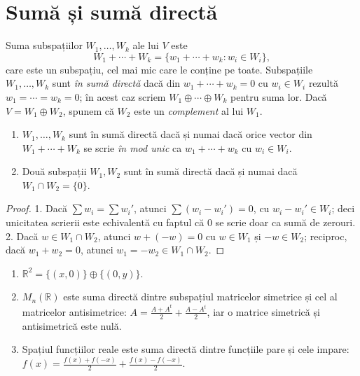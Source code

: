 \section{Sumă și sumă directă}

\begin{definitie}
Suma subspațiilor $W_1,\dots,W_k$ ale lui $V$ este
\[
W_1+\cdots+W_k=\{w_1+\cdots+w_k : w_i\in W_i\},
\]
care este un subspațiu, cel mai mic care le conține pe toate. Subspațiile $W_1,\dots,W_k$ sunt \emph{în sumă directă} dacă din $w_1+\cdots+w_k=0$ cu $w_i\in W_i$ rezultă $w_1=\cdots=w_k=0$; în acest caz scriem $W_1\oplus\cdots\oplus W_k$ pentru suma lor. Dacă $V=W_1\oplus W_2$, spunem că $W_2$ este un \emph{complement} al lui $W_1$.
\end{definitie}

\begin{propozitie}\label{prop:sumadirecta}
\begin{enumerate}
\item $W_1,\dots,W_k$ sunt în sumă directă dacă și numai dacă orice vector din $W_1+\cdots+W_k$ se scrie \emph{în mod unic} ca $w_1+\cdots+w_k$ cu $w_i\in W_i$.
\item Două subspații $W_1,W_2$ sunt în sumă directă dacă și numai dacă $W_1\cap W_2=\{0\}$.
\end{enumerate}
\end{propozitie}

\begin{proof}
1. Dacă $\sum w_i=\sum w_i'$, atunci $\sum(w_i-w_i')=0$, cu $w_i-w_i'\in W_i$; deci unicitatea scrierii este echivalentă cu faptul că $0$ se scrie doar ca sumă de zerouri.
2. Dacă $w\in W_1\cap W_2$, atunci $w+(-w)=0$ cu $w\in W_1$ și $-w\in W_2$; reciproc, dacă $w_1+w_2=0$, atunci $w_1=-w_2\in W_1\cap W_2$.
\end{proof}

\begin{exemplu}
\begin{enumerate}
\item $\mathbb{R}^2=\{(x,0)\}\oplus\{(0,y)\}$.
\item $M_n(\mathbb{R})$ este suma directă dintre subspațiul matricelor simetrice și cel al matricelor antisimetrice: $A=\frac{A+A^t}2+\frac{A-A^t}2$, iar o matrice simetrică și antisimetrică este nulă.
\item Spațiul funcțiilor reale este suma directă dintre funcțiile pare și cele impare: $f(x)=\frac{f(x)+f(-x)}2+\frac{f(x)-f(-x)}2$.
\end{enumerate}
\end{exemplu}

